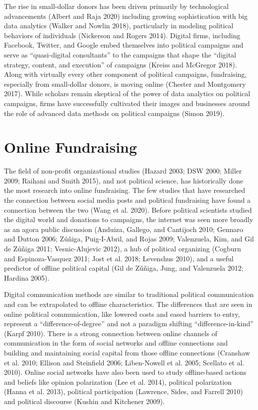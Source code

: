 \documentclass[12pt,]{article}
\begin{document}
The rise in small-dollar donors has been driven primarily by
technological advancements (Albert and Raja 2020) including growing
sophistication with big data analytics (Walker and Nowlin 2018),
particularly in modeling political behaviors of individuals (Nickerson
and Rogers 2014). Digital firms, including Facebook, Twitter, and Google
embed themselves into political campaigns and serve as ``quasi-digital
consultants'' to the campaigns that shape the ``digital strategy,
content, and execution'' of campaigns (Kreiss and McGregor 2018). Along
with virtually every other component of political campaigns,
fundraising, especially from small-dollar donors, is moving online
(Chester and Montgomery 2017). While scholars remain skeptical of the
power of data analytics on political campaigns, firms have successfully
cultivated their images and businesses around the role of advanced data
methods on political campaigns (Simon 2019).

\hypertarget{online-fundraising}{%
\section{Online Fundraising}\label{online-fundraising}}

The field of non-profit organizational studies (Hazard 2003; DSW 2000;
Miller 2009; Raihani and Smith 2015), and not political science, has
historically done the most research into online fundraising. The few
studies that have researched the connection between social media posts
and political fundraising have found a connection between the two (Wang
et al. 2020). Before political scientists studied the digital world and
donations to campaigns, the internet was seen more broadly as an agora
public discussion (Anduiza, Gallego, and Cantijoch 2010; Gennaro and
Dutton 2006; Zúñiga, Puig-I-Abril, and Rojas 2009; Valenzuela, Kim, and
Gil de Zúñiga 2011; Vesnic-Alujevic 2012), a hub of political organizing
(Cogburn and Espinoza-Vasquez 2011; Jost et al. 2018; Levenshus 2010),
and a useful predictor of offline political capital (Gil de Zúñiga,
Jung, and Valenzuela 2012; Hardina 2005).

Digital communication methods are similar to traditional political
communication and can be extrapolated to offline characteristics. The
differences that are seen in online political communication, like
lowered costs and eased barriers to entry, represent a
``difference-of-degree'' and not a paradigm shifting
``difference-in-kind'' (Karpf 2010). There is a strong connection
between online channels of communication in the form of social networks
and offline connections and building and maintaining social capital from
those offline connections (Cranshaw et al. 2010; Ellison and Steinfield
2006; Liben-Nowell et al. 2005; Scellato et al. 2010). Online social
networks have also been used to study offline-based actions and beliefs
like opinion polarization (Lee et al. 2014), political polarization
(Hanna et al. 2013), political participation (Lawrence, Sides, and
Farrell 2010) and political discourse (Kushin and Kitchener 2009).
\end{document}
